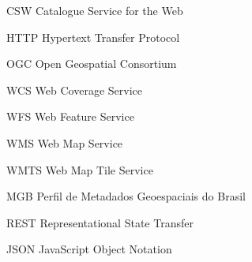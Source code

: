 \begin{siglas} %
  \item[CSW] Catalogue Service for the Web
  \item[HTTP] Hypertext Transfer Protocol
  \item[OGC] Open Geospatial Consortium
  \item[WCS] Web Coverage Service
  \item[WFS] Web Feature Service
  \item[WMS] Web Map Service
  \item[WMTS] Web Map Tile Service
  \item[MGB] Perfil de Metadados Geoespaciais do Brasil
  \item[REST] Representational State Transfer
  \item[JSON] JavaScript Object Notation
\end{siglas}

